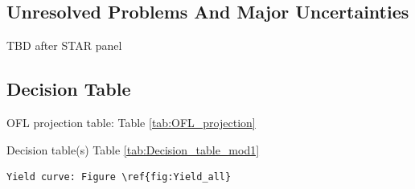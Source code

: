 \documentclass[12pt,]{article}
\begin{document}
\subsection*{Unresolved Problems And Major
Uncertainties}\label{unresolved-problems-and-major-uncertainties}

TBD after STAR panel

\FloatBarrier

\subsection*{Decision Table}\label{decision-table}

OFL projection table: Table \ref{tab:OFL_projection}

Decision table(s) Table \ref{tab:Decision_table_mod1}

\begin{verbatim}
Yield curve: Figure \ref{fig:Yield_all}
\end{verbatim}
\end{document}
